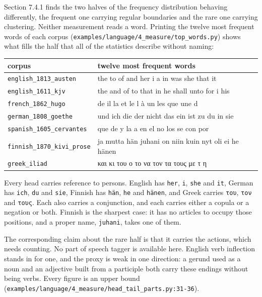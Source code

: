 Section 7.4.1 finds the two halves of the frequency distribution behaving differently, the frequent one carrying regular boundaries and the rare one carrying clustering. Neither measurement reads a word. Printing the twelve most frequent words of each corpus (\texttt{examples/\allowbreak{}language/\allowbreak{}4\_\allowbreak{}measure/\allowbreak{}top\_\allowbreak{}words.\allowbreak{}py}) shows what fills the half that all of the statistics describe without naming:

\tiny
\setlength{\tabcolsep}{2pt}
\begin{longtable}{@{}>{\raggedright\arraybackslash}p{}>{\raggedright\arraybackslash}p{}@{}}
\toprule
corpus & twelve most frequent words \\
\midrule
\texttt{english\_\allowbreak{}1813\_\allowbreak{}austen} & the to of and her i a in was she that it \\
\texttt{english\_\allowbreak{}1611\_\allowbreak{}kjv} & the and of to that in he shall unto for i his \\
\texttt{french\_\allowbreak{}1862\_\allowbreak{}hugo} & de il la et le l à un les que une d \\
\texttt{german\_\allowbreak{}1808\_\allowbreak{}goethe} & und ich die der nicht das ein ist zu du in sie \\
\texttt{spanish\_\allowbreak{}1605\_\allowbreak{}cervantes} & que de y la a en el no los se con por \\
\texttt{finnish\_\allowbreak{}1870\_\allowbreak{}kivi\_\allowbreak{}prose} & ja mutta hän juhani on niin kuin nyt oli ei he hänen \\
\texttt{greek\_\allowbreak{}iliad} & και κι του ο το να τον τα τους με τ η \\
\bottomrule
\end{longtable}
\normalsize

Every head carries reference to persons. English has \texttt{her}, \texttt{i}, \texttt{she} and \texttt{it}, German has \texttt{ich}, \texttt{du} and \texttt{sie}, Finnish has \texttt{hän}, \texttt{he} and \texttt{hänen}, and Greek carries \texttt{του}, \texttt{τον} and \texttt{τους}. Each also carries a conjunction, and each carries either a copula or a negation or both. Finnish is the sharpest case: it has no articles to occupy those positions, and a proper name, \texttt{juhani}, takes one of them.

The corresponding claim about the rare half is that it carries the actions, which needs counting. No part of speech tagger is available here. English verb inflection stands in for one, and the proxy is weak in one direction: a gerund used as a noun and an adjective built from a participle both carry these endings without being verbs. Every figure is an upper bound (\texttt{examples/\allowbreak{}language/\allowbreak{}4\_\allowbreak{}measure/\allowbreak{}head\_\allowbreak{}tail\_\allowbreak{}parts.\allowbreak{}py:31-\allowbreak{}36}).

